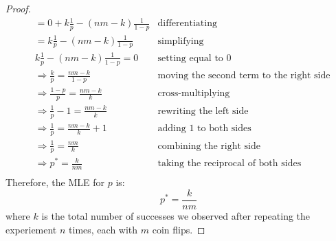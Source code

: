\documentclass[11pt]{article}
\begin{document}
\begin{proof}
\begin{align*}
		&= 0 + k \frac{1}{p} - (nm - k) \frac{1}{1 - p} & \text{differentiating} \\
		&= k \frac{1}{p} - (nm - k) \frac{1}{1 - p} & \text{simplifying} \\
		& k \frac{1}{p} - (nm - k) \frac{1}{1 - p} = 0 & \text{setting equal to } 0 \\
		&\Rightarrow \frac{k}{p} = \frac{nm - k}{1 - p} & \text{moving the second term to the right side} \\
		&\Rightarrow \frac{1 - p}{p} = \frac{nm - k}{k} & \text{cross-multiplying} \\
		&\Rightarrow \frac{1}{p} - 1 = \frac{nm - k}{k} & \text{rewriting the left side} \\
		&\Rightarrow \frac{1}{p} = \frac{nm - k}{k} + 1 & \text{adding } 1 \text{ to both sides} \\
		&\Rightarrow \frac{1}{p} = \frac{nm}{k} & \text{combining the right side} \\
		&\Rightarrow p^* = \frac{k}{nm} & \text{taking the reciprocal of both sides} \\
	\end{align*}
	Therefore, the MLE for $p$ is:
	\[
		p^* = \frac{k}{nm}
	\]
	where $k$ is the total number of successes we observed after repeating the experiement $n$ times, each with $m$ coin flips.
\end{proof}
\end{document}
